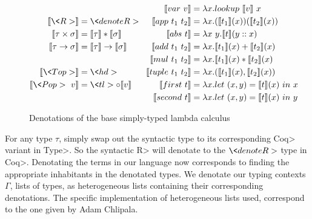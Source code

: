 \documentclass[11pt, final]{article}
\begin{document}
  \begin{figure}
    \centering
    \begin{equation*}
      \begin{split}
        \llbracket \<R> \rrbracket &= \<denoteR> \\
        \llbracket \tau \times \sigma \rrbracket &=
          \llbracket \tau \rrbracket * \llbracket \sigma \rrbracket \\
        \llbracket \tau \rightarrow \sigma \rrbracket &= \llbracket \tau \rrbracket \rightarrow \llbracket \sigma \rrbracket \\
        \\
        \llbracket \<Top> \rrbracket &= \<hd> \\
        \llbracket \<Pop>\ v \rrbracket &= \<tl> \circ \llbracket v \rrbracket \\
      \end{split}
      \;\;\;
      \begin{split}
        \llbracket \var{v} \rrbracket &=
          \lambda x. lookup\ \llbracket v \rrbracket\ x \\
        \llbracket \app{t_1}{t_2} \rrbracket &=
          \lambda x. (\llbracket t_1 \rrbracket(x)) (\llbracket t_2 \rrbracket(x)) \\
        \llbracket \abs{t} \rrbracket &=
          \lambda x\ y. \llbracket t \rrbracket(y :: x) \\
        \llbracket \add{t_1}{t_2} \rrbracket &=
          \lambda x. \llbracket t_1 \rrbracket(x) + \llbracket t_2 \rrbracket(x) \\
        \llbracket \mul{t_1}{t_2} \rrbracket &=
          \lambda x. \llbracket t_1 \rrbracket(x) * \llbracket t_2 \rrbracket(x) \\
        \llbracket \tuple{t_1}{t_2} \rrbracket &=
          \lambda x. (\llbracket t_1 \rrbracket(x), \llbracket t_2 \rrbracket(x)) \\
        \llbracket \first{t} \rrbracket &=
          \lambda x. let\ (x, y) = \llbracket t \rrbracket(x)\ in\ x \\
        \llbracket \second{t} \rrbracket &=
          \lambda x. let\ (x, y) = \llbracket t \rrbracket(x)\ in\ y \\
      \end{split}
    \end{equation*}
    \caption{Denotations of the base simply-typed lambda calculus}
    \label{eqn:lr_base}
  \end{figure}

  For any type $\tau$, simply swap out the syntactic type to its corresponding \<Coq> variant in \<Type>.
  So the syntactic \<R> will denotate to the $\<denoteR>$ type in \<Coq>.
  Denotating the terms in our language now corresponds to finding the appropriate inhabitants in the denotated types.
  We denotate our typing contexts $\Gamma$, lists of types, as heterogeneous lists containing their corresponding denotations.
  The specific implementation of heterogeneous lists used, correspond to the one given by Adam Chlipala\cite{ChlipalaCPDT}.
\end{document}
